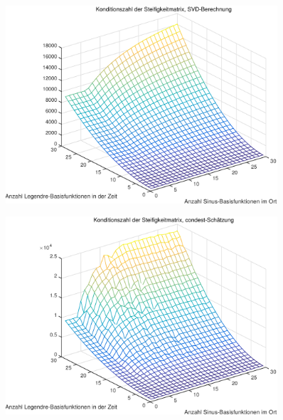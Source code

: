 

\clearpage
\begin{figure}[tb]
    \begin{center}
        \includegraphics[width=0.9\textwidth]{figures/oned/conds.pdf}
    \end{center}
\end{figure}

\begin{figure}[tb]
    \begin{center}
        \includegraphics[width=0.9\textwidth]{figures/oned/condest.pdf}
    \end{center}
\end{figure}

